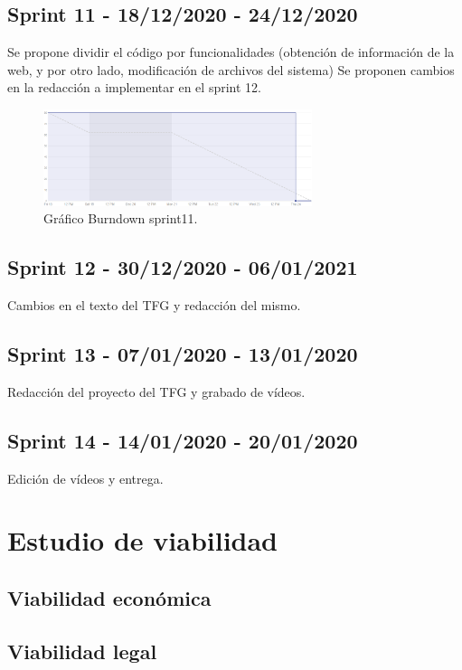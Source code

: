 \subsection{Sprint 11 - 18/12/2020 - 24/12/2020}
Se propone dividir el código por funcionalidades (obtención de información de la web, y por otro lado, modificación de archivos del sistema)
Se proponen cambios en la redacción a implementar en el sprint 12.
\begin{figure}
    \centering
    \includegraphics[width=0.7\textwidth]{img/BurnDown/11.PNG}
    \caption{Gráfico Burndown sprint11. } \label{BD11}
\end{figure}


\subsection{Sprint 12 - 30/12/2020 - 06/01/2021}
Cambios en el texto del TFG y redacción del mismo.

\subsection{Sprint 13 - 07/01/2020 - 13/01/2020}
Redacción del proyecto del TFG y grabado de vídeos.

\subsection{Sprint 14 - 14/01/2020 - 20/01/2020}
Edición de vídeos y entrega.



\section{Estudio de viabilidad}

\subsection{Viabilidad económica}

\subsection{Viabilidad legal}


